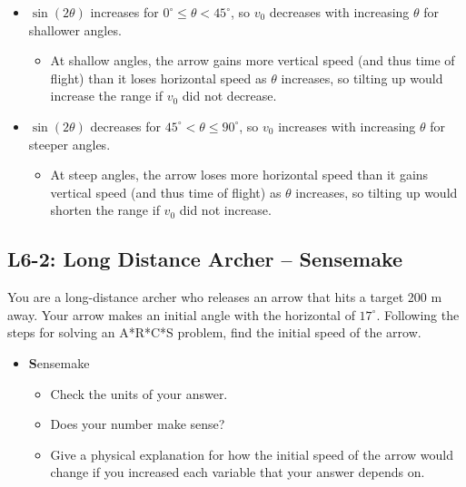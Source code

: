 \documentclass[]{article}
\begin{document}
\begin{TeacherMargin}
\begin{itemize}
\begin{itemize}
		\vspace{-10pt}
		\begin{center}
		\end{center}
		\vspace{-10pt}
		\item $\sin(2\theta)$ increases for $0^{\circ}\leq\theta<45^{\circ}$, so $v_{0}$ decreases with increasing $\theta$ for shallower angles.
		\begin{itemize}
			\item At shallow angles, the arrow gains more vertical speed (and thus time of flight) than it loses horizontal speed as $\theta$ increases, so tilting up would increase the range if $v_{0}$ did not decrease.
		\end{itemize}
		\item $\sin(2\theta)$ decreases for $45^{\circ}<\theta\leq90^{\circ}$, so $v_{0}$ increases with increasing $\theta$ for steeper angles.
		\begin{itemize}
			\item At steep angles, the arrow loses more horizontal speed than it gains vertical speed (and thus time of flight) as $\theta$ increases, so tilting up would shorten the range if $v_{0}$ did not increase.
		\end{itemize}
	\end{itemize}
\end{itemize}
\end{TeacherMargin}
\begin{PresentSpace}
\vspace{-10pt}
\section*{L6-2: Long Distance Archer -- Sensemake}
\vspace{-10pt}
You are a long-distance archer who releases an arrow that hits a target 200 m away. Your arrow makes an initial angle with the horizontal of $17^{\circ}$. Following the steps for solving an A*R*C*S problem, find the initial speed of the arrow.
\begin{itemize}
	\item \textbf{S}ensemake
	\begin{itemize}
		\item Check the units of your answer.
		\item Does your number make sense?
		\item Give a physical explanation for how the initial speed of the arrow would change if you increased each variable that your answer depends on.
	\end{itemize}
\end{itemize}
\end{PresentSpace}
\end{document}
